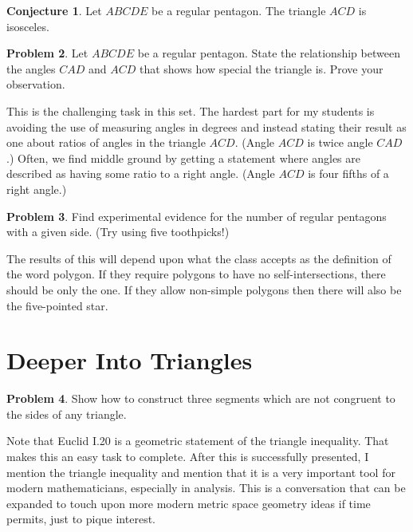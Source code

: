 \documentclass{tufte-handout}
\theoremstyle{definition}
\newtheorem{problem}{Problem}[section]
\newtheorem{conjecture}[problem]{Conjecture}
\begin{document}
\begin{conjecture}\label{conj:regular-pentagon-central-triangle}
Let $ABCDE$ be a regular pentagon. The triangle $ACD$ is isosceles.
\end{conjecture}

\begin{problem}\label{prob:reg-pentagon-angles}
Let $ABCDE$ be a regular pentagon. State the relationship between the angles $CAD$ and $ACD$ that shows how special the triangle is. Prove your observation.
\end{problem}

This is the challenging task in this set. The hardest part for my students is avoiding the use of measuring angles in degrees and instead stating their result as one about ratios of angles in the triangle $ACD$. (Angle $ACD$ is twice angle $CAD$.) Often, we find middle ground by getting a statement where angles are described as having some ratio to a right angle. (Angle $ACD$ is four fifths of a right angle.)

\begin{problem}\label{prob:reg-pentagon-types}
Find experimental evidence for the number of regular pentagons with a given side. (Try using five toothpicks!)\\[.1in]
\end{problem}

The results of this will depend upon what the class accepts as the definition of the word polygon. If they require polygons to have no self-intersections, there should be only the one. If they allow non-simple polygons then there will also be the five-pointed star.


\clearpage
\setcounter{section}{7}
\setcounter{problem}{0}
\section{Deeper Into Triangles}


\begin{problem}
\label{prob:triangle-inequality}
Show how to construct three segments which are not congruent to the sides of any triangle.
\end{problem}

Note that Euclid I.20 is a geometric statement of the triangle inequality. That makes this an easy task to complete. After this is successfully presented, I mention the triangle inequality and mention that it is a very important tool for modern mathematicians, especially in analysis. This is a conversation that can be expanded to touch upon more modern metric space geometry ideas if time permits, just to pique interest.
\end{document}
